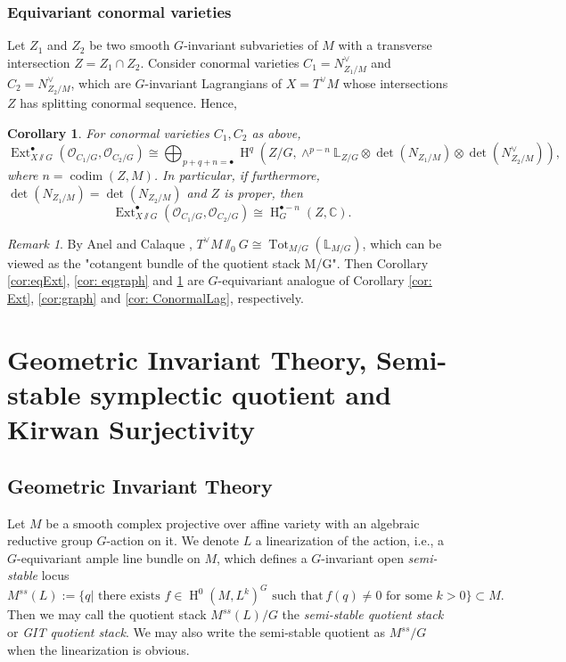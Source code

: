 \documentclass[12pt]{amsart}
\newtheorem{corollary}[theorem]{Corollary}
\theoremstyle{definition}
\theoremstyle{remark}
\newtheorem{remark}[theorem]{Remark}
\numberwithin{equation}{section}
\newcommand{\CC}{\mathbb{C}}
\newcommand{\LL}{\mathbb{L}}
\newcommand{\shO}{\mathcal{O}}
\newcommand{\codim}{\operatorname{codim}}
\newcommand{\Ext}{\operatorname{Ext}}
\newcommand{\Tot}{\operatorname{Tot}}
\newcommand{\Hdot}{\operatorname{H}}
\begin{document}
\subsubsection{Equivariant conormal varieties}Let $Z_1$ and $Z_2$ be two smooth $G$-invariant subvarieties of $M$ with a transverse intersection $Z=Z_1\cap Z_2$. Consider conormal varieties $C_1=N_{Z_1/M}^{\vee}$ and $C_2=N_{Z_2/M}^{\vee}$,  which are $G$-invariant Lagrangians of $X=T^{\vee}M$ whose intersections $Z$ has splitting conormal sequence. Hence,
\begin{corollary}\label{cor: eqconormal}
    For conormal varieties $C_1, C_2$ as above, 
    $$ \Ext^{\bullet}_{X\sslash  G}(\shO_{C_1/G}, \shO_{C_2/G})\cong\bigoplus_{p+q+n=\bullet}
\Hdot^q(Z/G, \wedge^{p-n}\LL_{Z/G}\otimes \det(N_{Z_1/M})\otimes \det(N_{Z_2/M}^{\vee})),$$
where $n=\codim (Z, M)$.
In particular, if furthermore, $\det(N_{Z_1/M})=\det(N_{Z_2/M})$ and $Z$ is proper, then 
  $$ \Ext^{\bullet}_{X\sslash  G}(\shO_{C_1/G}, \shO_{C_2/G})\cong \Hdot^{\bullet-n}_G(Z, \CC).$$
  \end{corollary}
  \begin{remark}
      By Anel and Calaque \cite{anel2022shifted}, $T^{\vee}M\sslash_0  G\cong \Tot_{M/G}(\LL_{M/G})$, which can be viewed as the "cotangent bundle of the quotient stack M/G". Then Corollary \ref{cor:eqExt}, \ref{cor: eqgraph} and \ref{cor: eqconormal} are $G$-equivariant analogue of Corollary \ref{cor: Ext}, \ref{cor:graph} and \ref{cor: ConormalLag}, respectively.
  \end{remark}



\section{Geometric Invariant Theory, Semi-stable symplectic quotient and Kirwan Surjectivity}\label{sec:git}
\subsection{Geometric Invariant Theory}
Let $M$ be a smooth complex projective over affine variety with an algebraic reductive group $G$-action on it. We denote $L$ a linearization of the action, i.e., a $G$-equivariant ample line bundle on $M$, which defines a $G$-invariant open \emph{semi-stable} locus 
$$M^{ss}(L):=\{q|\text{ there exists } f\in \Hdot^0(M, L^k)^G \text{ such that}\,f(q)\neq 0 \text{ for some } k> 0\}\subset M.$$ Then we may call the quotient stack $M^{ss}(L)/G$ the \emph{semi-stable quotient stack} or \emph{GIT quotient stack}. We may also write the semi-stable quotient as $M^{ss}/G$ when the linearization is obvious. 
\end{document}
